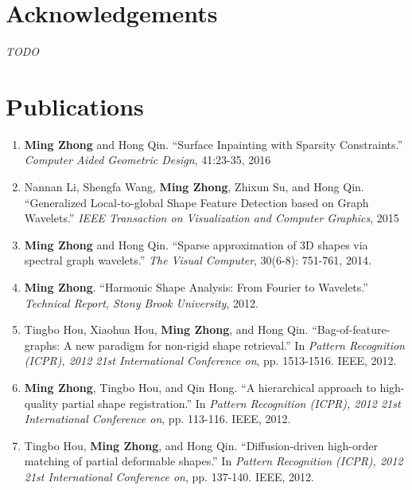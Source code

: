\documentclass[12pt,letterpaper,twosided]{report}
\numberwithin{equation}{section}
\begin{document}
\chapter*{Acknowledgements}
\emph{TODO}

\newpage
\chapter*{Publications}

\begin{enumerate}
\item \textbf{Ming Zhong} and Hong Qin. ``Surface Inpainting with Sparsity Constraints.'' \emph{Computer Aided Geometric Design}, 41:23-35, 2016
\item Nannan Li, Shengfa Wang, \textbf{Ming Zhong}, Zhixun Su, and Hong Qin. ``Generalized Local-to-global Shape Feature Detection based on Graph Wavelets.'' \emph{IEEE Transaction on Visualization and Computer Graphics}, 2015
\item \textbf{Ming Zhong} and Hong Qin. ``Sparse approximation of 3D shapes via spectral graph wavelets.'' \emph{The Visual Computer}, 30(6-8): 751-761, 2014.
\item \textbf{Ming Zhong}. ``Harmonic Shape Analysis: From Fourier to Wavelets.'' \emph{Technical Report, Stony Brook University}, 2012.
\item Tingbo Hou, Xiaohua Hou, \textbf{Ming Zhong}, and Hong Qin. ``Bag-of-feature-graphs: A new paradigm for non-rigid shape retrieval.'' In \emph{Pattern Recognition (ICPR), 2012 21st International Conference on}, pp. 1513-1516. IEEE, 2012.
\item \textbf{Ming Zhong}, Tingbo Hou, and Qin Hong. ``A hierarchical approach to high-quality partial shape registration.'' In \emph{Pattern Recognition (ICPR), 2012 21st International Conference on}, pp. 113-116. IEEE, 2012.
\item Tingbo Hou, \textbf{Ming Zhong}, and Hong Qin. ``Diffusion-driven high-order matching of partial deformable shapes.'' In \emph{Pattern Recognition (ICPR), 2012 21st International Conference on}, pp. 137-140. IEEE, 2012.
\end{enumerate}

\newpage
\pagestyle{fancy}
\fancyhead{}
\fancyhead[RO,LE]{\thepage}
\fancyhead[LO]{\leftmark}
\fancyhead[RE]{\rightmark}
\fancyfoot{}
\renewcommand{\headrulewidth}{0.5pt}

\graphicspath{{fig-intro/}}

\graphicspath{{figures/}}








{}


\end{document}
